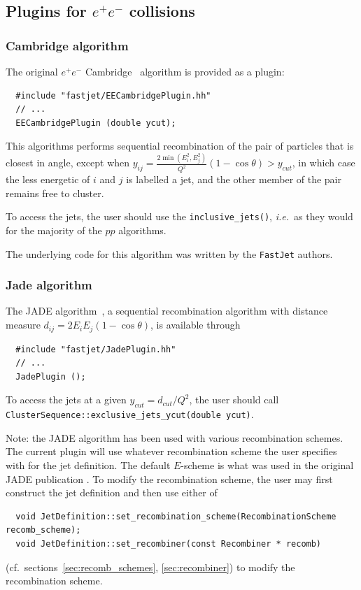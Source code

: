 \documentclass[12pt,a4]{article}
\newcommand{\fastjet}{\texttt{FastJet}\xspace}
\newcommand{\ttt}[1]{{\small\texttt{#1}}}
\newcommand{\ie}{{\it i.e.}\ }
\newcommand{\ee}{e^+e^-}
\begin{document}
\subsection{Plugins for $e^+e^-$ collisions}
\label{sec:other-ee-plugins}

\subsubsection{Cambridge algorithm}
\label{sec:ee-cam}
The original $\ee$ Cambridge~\cite{CamOrig} algorithm is provided as a plugin:
\begin{lstlisting}
  #include "fastjet/EECambridgePlugin.hh"
  // ...
  EECambridgePlugin (double ycut);
\end{lstlisting}
This algorithms performs sequential recombination of the pair of
particles that is closest in angle, except when $y_{ij} =
\frac{2\min(E_i^2,E_j^2)}{Q^2}(1-\cos\theta) > y_{cut}$, in which case
the less energetic of $i$ and $j$ is labelled a jet, and the other
member of the pair remains free to cluster.

To access the jets, the user should use the \verb|inclusive_jets()|,
\ie as they would for the majority of the $pp$ algorithms.

The underlying code for this algorithm was written by the \fastjet
authors.

\subsubsection{Jade algorithm}
\label{sec:ee-jade}
The JADE algorithm~\cite{Bartel:1986ua,Bethke:1988zc}, a sequential
recombination algorithm with distance measure $d_{ij} = 2E_i E_j
(1-\cos\theta)$, is available through
\begin{lstlisting}
  #include "fastjet/JadePlugin.hh"
  // ...
  JadePlugin ();
\end{lstlisting}
To access the jets at a given $y_{cut} = d_{cut}/Q^2$, the user 
should call \ttt{ClusterSequence::exclusive\_jets\_ycut(double ycut)}.

Note: the JADE algorithm has been used with various recombination
schemes. The current plugin will use whatever recombination scheme the
user specifies with for the jet definition. The default $E$-scheme is
what was used in the original JADE publication \cite{Bartel:1986ua}.
%
To modify the recombination scheme, the user may first construct the
jet definition and then use either of 
\begin{lstlisting}
  void JetDefinition::set_recombination_scheme(RecombinationScheme recomb_scheme);
  void JetDefinition::set_recombiner(const Recombiner * recomb)
\end{lstlisting}
(cf.~sections~\ref{sec:recomb_schemes}, \ref{sec:recombiner}) to modify the
recombination scheme.
\end{document}
